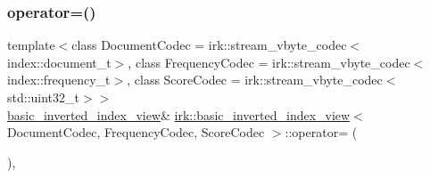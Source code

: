 \mbox{\label{classirk_1_1basic__inverted__index__view_a35a6bba483082c7060577551f1511763}} 
\subsubsection{\texorpdfstring{operator=()}{operator=()}\hspace{0.1cm}{\footnotesize\ttfamily [2/2]}}
{\footnotesize\ttfamily template$<$class Document\+Codec  = irk\+::stream\+\_\+vbyte\+\_\+codec$<$index\+::document\+\_\+t$>$, class Frequency\+Codec  = irk\+::stream\+\_\+vbyte\+\_\+codec$<$index\+::frequency\+\_\+t$>$, class Score\+Codec  = irk\+::stream\+\_\+vbyte\+\_\+codec$<$std\+::uint32\+\_\+t$>$$>$ \\
\mbox{\hyperlink{classirk_1_1basic__inverted__index__view}{basic\+\_\+inverted\+\_\+index\+\_\+view}}\& \mbox{\hyperlink{classirk_1_1basic__inverted__index__view}{irk\+::basic\+\_\+inverted\+\_\+index\+\_\+view}}$<$ Document\+Codec, Frequency\+Codec, Score\+Codec $>$\+::operator= (\begin{DoxyParamCaption}\item[{\mbox{\hyperlink{classirk_1_1basic__inverted__index__view}{basic\+\_\+inverted\+\_\+index\+\_\+view}}$<$ Document\+Codec, Frequency\+Codec, Score\+Codec $>$ \&\&}]{ }\end{DoxyParamCaption})\hspace{0.3cm}{\ttfamily [default]}, {\ttfamily [noexcept]}}

\mbox{\label{classirk_1_1basic__inverted__index__view_a5cfa1edc73b63f481e64b3adb18e846c}} 
